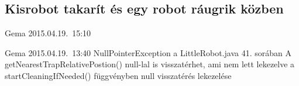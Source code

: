 \subsection{Kisrobot takarít és egy robot ráugrik közben}
\tesztok
{Gema}
{2015.04.19.~15:10}

\tesztfail
{Gema}
{2015.04.19.~13:40}
{NullPointerException a LittleRobot.java 41. sorában}
{A getNearestTrapRelativePostion() null-lal is visszatérhet, ami nem lett lekezelve a startCleaningIfNeeded() függvényben}
{null visszatérés lekezelése}